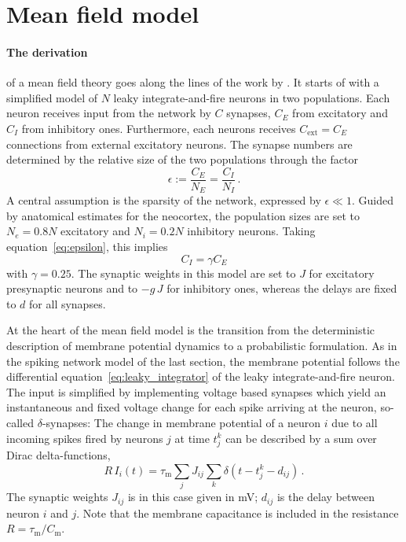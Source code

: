 \FloatBarrier
\section{Mean field model}
\paragraph{The derivation} of a mean field theory goes along the 
lines of the work by .
It starts of with a simplified model of 
$N$ leaky integrate-and-fire neurons in two populations. 
Each neuron receives input from the network by $C$ synapses, 
$C_E$ from excitatory and $C_I$ from inhibitory ones. 
Furthermore, each neurons receives $C_\text{ext} = C_E$ connections from 
external excitatory neurons.
The synapse numbers 
are determined by the relative size of the two populations through the factor
\begin{equation}
    \epsilon := \frac{C_E}{N_E} = \frac{C_I}{N_I} \,.
    \label{eq:epsilon}
\end{equation}
A central assumption is the sparsity of the network, expressed by $\epsilon \ll 1$.
Guided by anatomical estimates for the neocortex, the population sizes are set to
$N_e = 0.8N$ excitatory and $N_i = 0.2N$ inhibitory neurons. Taking equation~\eqref{eq:epsilon}, 
this implies 
\begin{equation}
    C_I = \gamma C_E 	
 \label{eq:C_I}
\end{equation}
with $\gamma = 0.25$. The synaptic weights in this model are set to $J$ for 
excitatory presynaptic neurons and to $-g\, J$ for inhibitory ones, 
whereas the delays are fixed to $d$ for all synapses. 

At the heart of the mean field model
is the transition from the deterministic description of membrane potential 
dynamics to a probabilistic formulation. 
As in the spiking network model of the last section, the membrane potential follows
the differential equation~\eqref{eq:leaky_integrator}
of the leaky integrate-and-fire neuron. The input is simplified 
by implementing voltage based synapses which
yield an instantaneous and fixed voltage change
for each spike arriving at the neuron, so-called $\delta$-synapses:
The change in membrane potential of a neuron $i$ due to all incoming spikes 
fired by neurons $j$ at time $t_j^k$ 
can be described by a sum over Dirac delta-functions, 
\begin{equation}
    R\,I_i(t) = \tau_\text{m} \sum_j J_{ij} \sum_k \delta(t - t_j^k - d_{ij}) \,.
    \label{eq:input_const_volt}
\end{equation}
The synaptic weights $J_{ij}$ is in this case given in mV; $d_{ij}$ is the delay 
between neuron $i$ and $j$. Note that the membrane capacitance is included in the 
resistance $R = \tau_\text{m} / C_\text{m}$.

